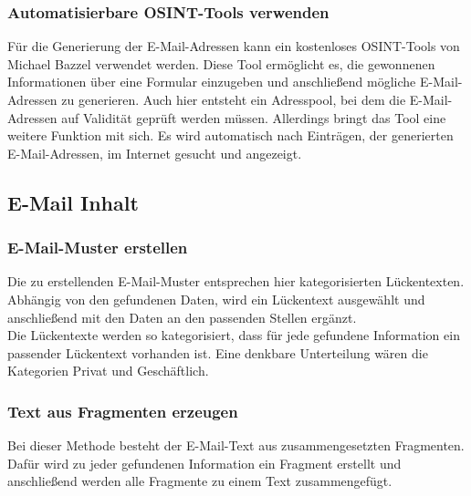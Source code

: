 		\subsubsection{Automatisierbare OSINT-Tools verwenden}
		Für die Generierung der E-Mail-Adressen kann ein kostenloses OSINT-Tools von Michael Bazzel verwendet werden. Diese Tool ermöglicht es, die gewonnenen Informationen über eine Formular einzugeben und anschließend mögliche E-Mail-Adressen zu generieren. Auch hier entsteht ein Adresspool, bei dem die E-Mail-Adressen auf Validität geprüft werden müssen. Allerdings bringt das Tool eine weitere Funktion mit sich. Es wird automatisch nach Einträgen, der generierten E-Mail-Adressen, im Internet gesucht und angezeigt. \cite{EmailAssumptions}
	\subsection{E-Mail Inhalt}
		\subsubsection{E-Mail-Muster erstellen}
		Die zu erstellenden E-Mail-Muster entsprechen hier kategorisierten Lückentexten. Abhängig von den gefundenen Daten, wird ein Lückentext ausgewählt und anschließend mit den Daten an den passenden Stellen ergänzt.\\
		Die Lückentexte werden so kategorisiert, dass für jede gefundene Information ein passender Lückentext vorhanden ist. Eine denkbare Unterteilung wären die Kategorien Privat und Geschäftlich.
		\subsubsection{Text aus Fragmenten erzeugen}
		Bei dieser Methode besteht der E-Mail-Text aus zusammengesetzten Fragmenten. Dafür wird zu jeder gefundenen Information ein Fragment erstellt und anschließend werden alle Fragmente zu einem Text zusammengefügt.
		
		
		
